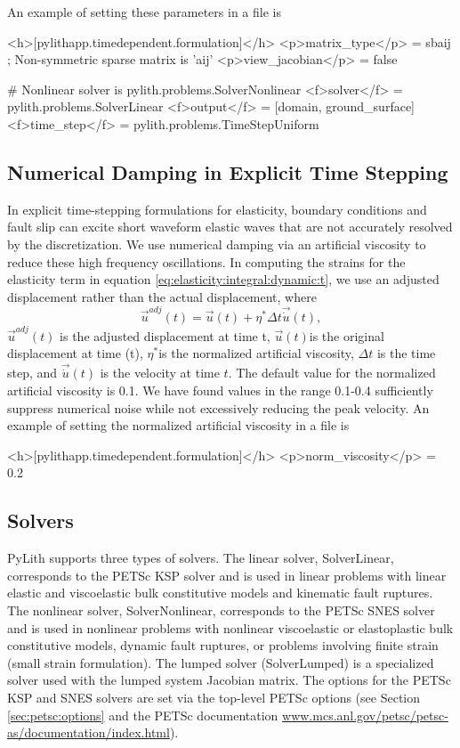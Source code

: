 An example of setting these parameters in a  file is
\begin{cfg}
<h>[pylithapp.timedependent.formulation]</h>
<p>matrix_type</p> = sbaij ; Non-symmetric sparse matrix is 'aij'
<p>view_jacobian</p> = false

# Nonlinear solver is pylith.problems.SolverNonlinear
<f>solver</f> = pylith.problems.SolverLinear
<f>output</f> = [domain, ground_surface]
<f>time_step</f> = pylith.problems.TimeStepUniform
\end{cfg}

\subsection{Numerical Damping in Explicit Time Stepping}

In explicit time-stepping formulations for elasticity, boundary conditions
and fault slip can excite short waveform elastic waves that are not
accurately resolved by the discretization. We use numerical damping
via an artificial viscosity\cite{Knopoff:Ni:2001,Day:Ely:2002} to
reduce these high frequency oscillations. In computing the strains
for the elasticity term in equation \vref{eq:elasticity:integral:dynamic:t},
we use an adjusted displacement rather than the actual displacement,
where 
\begin{equation}
\vec{u}^{adj}(t)=\vec{u}(t)+\eta^{*}\Delta t\vec{\dot{u}}(t),
\end{equation}
$\vec{u}^{adj}(t)$ is the adjusted displacement at time t, $\vec{u}(t)$is
the original displacement at time (t), $\eta^{*}$is the normalized
artificial viscosity, $\Delta t$ is the time step, and $\vec{\dot{u}}(t)$
is the velocity at time $t$. The default value for the normalized
artificial viscosity is 0.1. We have found values in the range 0.1-0.4
sufficiently suppress numerical noise while not excessively reducing
the peak velocity. An example of setting the normalized artificial
viscosity in a  file is
\begin{cfg}
<h>[pylithapp.timedependent.formulation]</h>
<p>norm_viscosity</p> = 0.2
\end{cfg}

\subsection{Solvers}
\label{sec:solvers}

PyLith supports three types of solvers. The linear solver,
SolverLinear, corresponds to the PETSc KSP solver and is used in
linear problems with linear elastic and viscoelastic bulk constitutive
models and kinematic fault ruptures. The nonlinear solver,
SolverNonlinear, corresponds to the PETSc SNES solver and is used in
nonlinear problems with nonlinear viscoelastic or elastoplastic bulk
constitutive models, dynamic fault ruptures, or problems involving
finite strain (small strain formulation).  The lumped solver
(SolverLumped) is a specialized solver used with the lumped system
Jacobian matrix. The options for the PETSc KSP and SNES solvers are
set via the top-level PETSc options (see Section
\vref{sec:petsc:options} and the PETSc documentation
\url{www.mcs.anl.gov/petsc/petsc-as/documentation/index.html}).


